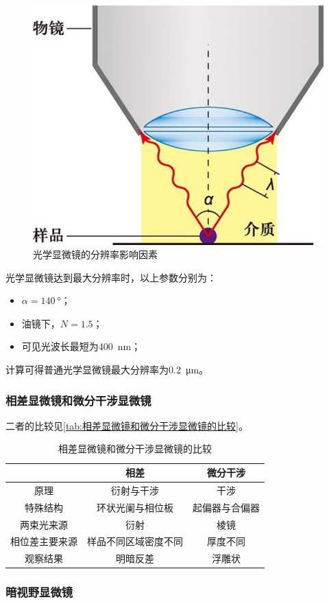 \begin{figure}[htbp]
	\centering
	\includegraphics[width=0.4\linewidth]{Pics/光学显微镜的分辨率影响因素}
	\caption{光学显微镜的分辨率影响因素}
	\label{fig:opticalMicroscopeResolutionInfluencingFactors}
\end{figure}

光学显微镜达到最大分辨率时，以上参数分别为：
\begin{itemize}
	\item $\alpha=\SI{140}{\degree}$；
	\item 油镜下，$N=1.5$；
	\item 可见光波长最短为\SI{400}{\nm}；
\end{itemize}

计算可得普通光学显微镜最大分辨率为\SI{0.2}{\um}。

\subsubsection{相差显微镜和微分干涉显微镜}

二者的比较见\autoref{tab:相差显微镜和微分干涉显微镜的比较}。

\begin{table}[htbp]
	\centering
	\begin{tabularx}{\textwidth}{|c|C|C|}
		\hline
		& \textbf{相差} & \textbf{微分干涉} \\ \hline
		原理 & 衍射与干涉 & 干涉 \\ \hline
		特殊结构 & 环状光阑与相位板 & 起偏器与合偏器 \\ \hline
		两束光来源 & 衍射 & 棱镜 \\ \hline
		相位差主要来源 & 样品不同区域密度不同 & 厚度不同 \\ \hline
		观察结果 & 明暗反差 & 浮雕状 \\ \hline
	\end{tabularx}
	\caption{相差显微镜和微分干涉显微镜的比较}
	\label{tab:相差显微镜和微分干涉显微镜的比较}
\end{table}

\subsubsection{暗视野显微镜}

